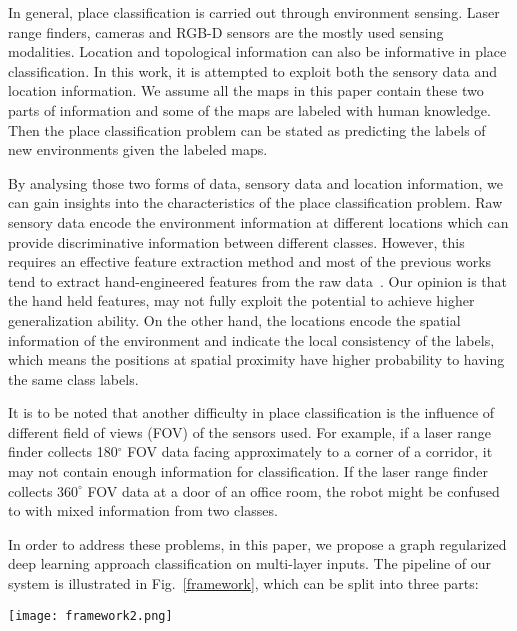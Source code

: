 \documentclass[letterpaper, 10 pt, conference]{ieeeconf}  %
\begin{document}
In general, place classification is carried out through environment sensing. Laser range finders, cameras and RGB-D sensors are the mostly used sensing modalities. Location and topological information can also be informative in place classification. In this work, it is attempted to exploit both the sensory data and location information. We assume all the maps in this paper contain these two parts of information and some of the maps are labeled with human knowledge. Then the place classification problem can be stated as predicting the labels of new environments given the labeled maps.


By analysing those two forms of data, sensory data and location information,  we can gain insights into the characteristics of the place classification problem. Raw sensory data encode the environment information at different locations which can provide discriminative information between different classes. However, this requires an effective feature extraction method and most of the previous works tend to extract hand-engineered features from the raw data~\cite{mozos2005supervised,sousa2007real}. Our opinion is that the hand held features, may not fully exploit the potential to achieve higher generalization ability. On the other hand, the locations encode the spatial information of the environment and indicate the local consistency of the labels, which means the positions at spatial proximity have higher probability to having the same class labels.

It is to be noted that another difficulty in place classification is the influence of different field of views (FOV) of the sensors used. For example, if a laser range finder collects 180$^\circ$ FOV data facing approximately to a corner of a corridor, it may not contain enough information for classification. If the laser range finder collects $360^\circ$ FOV data at a door of an office room, the robot might  be confused to with mixed information from two classes.


In order to address these problems, in this paper, we propose a graph regularized deep learning approach classification on multi-layer inputs.  The pipeline of our system is illustrated in Fig.~\ref{framework}, which can be split into three parts:

\begin{figure*}[tpb]
\centering
\texttt{[image: framework2.png]}
\caption{Pipeline of the semi-supervised learning system with multi-layer inputs.}
\label{framework}
\end{figure*}
\end{document}
